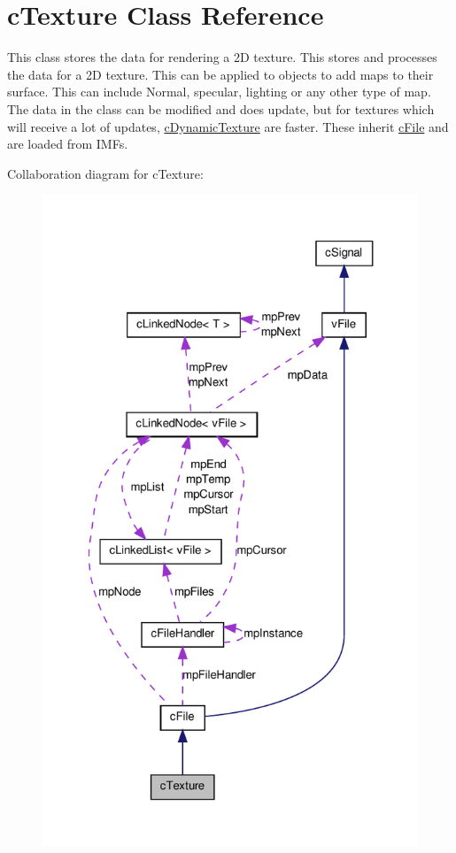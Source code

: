 \hypertarget{classc_texture}{
\section{cTexture Class Reference}
\label{classc_texture}
}


This class stores the data for rendering a 2D texture. This stores and processes the data for a 2D texture. This can be applied to objects to add maps to their surface. This can include Normal, specular, lighting or any other type of map. The data in the class can be modified and does update, but for textures which will receive a lot of updates, \hyperlink{classc_dynamic_texture}{cDynamicTexture} are faster. These inherit \hyperlink{classc_file}{cFile} and are loaded from IMFs.  




Collaboration diagram for cTexture:\nopagebreak
\begin{figure}[H]
\begin{center}
\leavevmode
\includegraphics[width=325pt]{classc_texture__coll__graph}
\end{center}
\end{figure}
